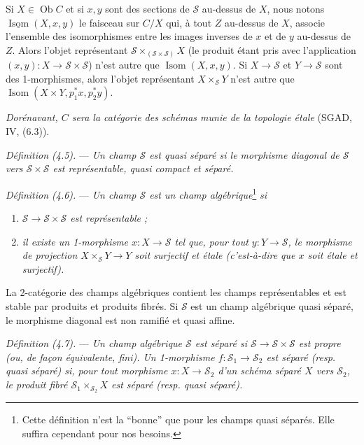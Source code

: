 \documentclass[10pt]{article}
\newcommand{\Isom}{\operatorname{Isom}}
\begin{document}
Si $X\in\operatorname{Ob} C$ et si $x,y$ sont des sections de $\mathscr S$ au-dessus de $X$, nous notons $\underline{\Isom}(X,x,y)$ le faisceau sur $C/X$ qui, à tout $Z$ au-dessus de $X$, associe l'ensemble des isomorphismes entre les images inverses de $x$ et de $y$ au-dessus de $Z$. Alors l'objet représentant $\mathscr S\times_{(\mathscr S\times\mathscr S)}X$ (le produit étant pris avec l'application $(x,y):X\to\mathscr S\times\mathscr S$) n'est autre que $\Isom(X,x,y)$. Si $X\to\mathscr S$ et $Y\to\mathscr S$ sont des 1-morphismes, alors l'objet représentant $X\times_{\mathscr S}Y$ n'est autre que $\Isom(X\times Y,p_1^*x,p_2^*y)$.

\emph{Dorénavant, $C$ sera la catégorie des schémas munie de la topologie étale} (SGAD, IV, (6.3)).

\medskip
\noindent\emph{Définition (4.5).} --- \emph{Un champ $\mathscr S$ est quasi séparé si le morphisme diagonal de $\mathscr S$ vers $\mathscr S\times\mathscr S$ est représentable, quasi compact et séparé.}

\medskip
\noindent\emph{Définition (4.6).} --- \emph{Un champ $\mathscr S$ est un champ algébrique}\footnote{Cette définition n'est la ``bonne'' que pour les champs quasi séparés. Elle suffira cependant pour nos besoins.}\emph{ si}
\begin{enumerate}[label=(\roman*)]
\item \emph{$\mathscr S\to\mathscr S\times\mathscr S$ est représentable ;}
\item \emph{il existe un 1-morphisme $x:X\to\mathscr S$ tel que, pour tout $y:Y\to\mathscr S$, le morphisme de projection $X\times_{\mathscr S}Y\to Y$ soit surjectif et étale (c'est-à-dire que $x$ soit étale et surjectif).}
\end{enumerate}

La 2-catégorie des champs algébriques contient les champs représentables et est stable par produits et produits fibrés. Si $\mathscr S$ est un champ algébrique quasi séparé, le morphisme diagonal est non ramifié et quasi affine.

\medskip
\noindent\emph{Définition (4.7).} --- \emph{Un champ algébrique $\mathscr S$ est séparé si $\mathscr S\to\mathscr S\times\mathscr S$ est propre (ou, de façon équivalente, fini). Un 1-morphisme $f:\mathscr S_1\to\mathscr S_2$ est séparé (resp. quasi séparé) si, pour tout morphisme $x:X\to\mathscr S_2$ d'un schéma séparé $X$ vers $\mathscr S_2$, le produit fibré $\mathscr S_1\times_{\mathscr S_2}X$ est séparé (resp. quasi séparé).}
\end{document}
